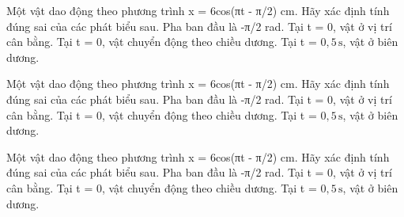 \begin{ex}
Một vật dao động theo phương trình x = 6cos(πt - π/2) cm. Hãy xác định tính đúng sai của các phát biểu sau.
\choiceTF
{\True Pha ban đầu là -π/2 rad.}
{\True Tại t = 0, vật ở vị trí cân bằng.}
{\True Tại t = 0, vật chuyển động theo chiều dương.}
{\True Tại t = $0,5\,\text{s}$, vật ở biên dương.}
\end{ex}

\begin{ex}
Một vật dao động theo phương trình x = 6cos(πt - π/2) cm. Hãy xác định tính đúng sai của các phát biểu sau.
\choiceTF
{\True Pha ban đầu là -π/2 rad.}
{\True Tại t = 0, vật ở vị trí cân bằng.}
{\True Tại t = 0, vật chuyển động theo chiều dương.}
{\True Tại t = $0,5\,\text{s}$, vật ở biên dương.}
\end{ex}

\begin{ex}
Một vật dao động theo phương trình x = 6cos(πt - π/2) cm. Hãy xác định tính đúng sai của các phát biểu sau.
\choiceTF
{\True Pha ban đầu là -π/2 rad.}
{\True Tại t = 0, vật ở vị trí cân bằng.}
{\True Tại t = 0, vật chuyển động theo chiều dương.}
{\True Tại t = $0,5\,\text{s}$, vật ở biên dương.}
\end{ex}


